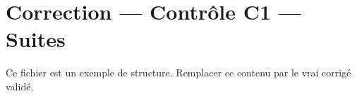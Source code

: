 \documentclass[11pt,a4paper]{article}
\begin{document}
\section*{Correction — Contrôle C1 — Suites}

Ce fichier est un exemple de structure. Remplacer ce contenu par le vrai corrigé validé.
\end{document}
